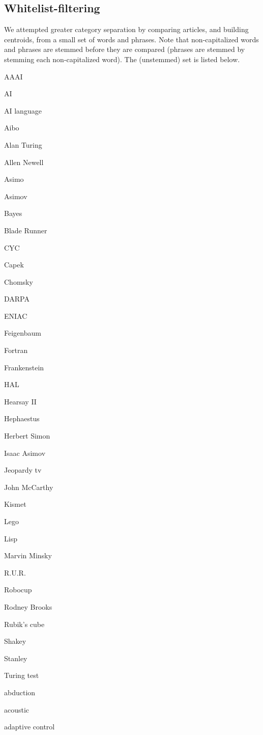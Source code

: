 \documentclass{article}
\begin{document}
\subsection{Whitelist-filtering}

We attempted greater category separation by comparing articles, and building
centroids, from a small set of words and phrases. Note that non-capitalized
words and phrases are stemmed before they are compared (phrases are stemmed by
stemming each non-capitalized word). The (unstemmed) set is listed below.

\begin{multicols}{3}
\footnotesize
AAAI

AI

AI language

Aibo

Alan Turing

Allen Newell

Asimo

Asimov

Bayes

Blade Runner

CYC

Capek

Chomsky

DARPA

ENIAC

Feigenbaum

Fortran

Frankenstein

HAL

Hearsay II

Hephaestus

Herbert Simon

Isaac Asimov

Jeopardy tv

John McCarthy

Kismet

Lego

Lisp

Marvin Minsky

R.U.R.

Robocup

Rodney Brooks

Rubik's cube

Shakey

Stanley

Turing test

abduction

acoustic

adaptive control


\end{multicols}
\end{document}
